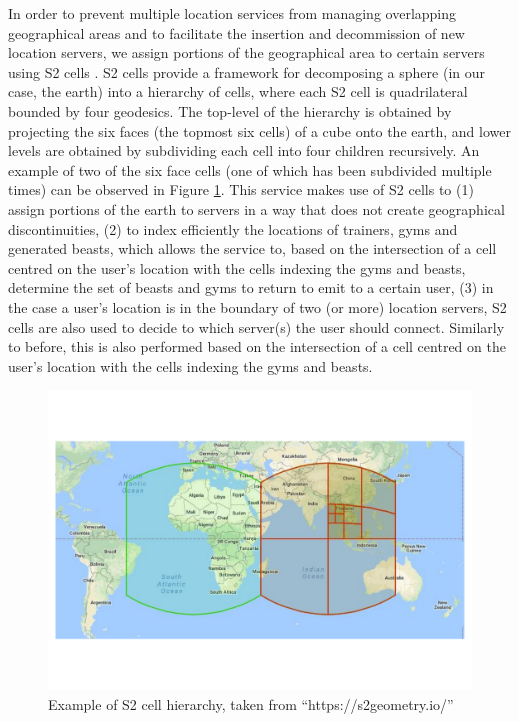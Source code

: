 In order to prevent multiple location services from managing overlapping geographical areas and to facilitate the insertion and decommission of new location servers, we assign portions of the geographical area to certain servers using S2 cells \cite{s2geometry}. S2 cells provide a framework for decomposing a sphere (in our case, the earth) into a hierarchy of cells, where each S2 cell is quadrilateral bounded by four geodesics. The top-level of the hierarchy is obtained by projecting the six faces (the topmost six cells) of a cube onto the earth, and lower levels are obtained by subdividing each cell into four children recursively. An example of two of the six face cells (one of which has been subdivided multiple times) can be observed in Figure \ref{fig:pouchbeasts-s2cells}. This service makes use of S2 cells to (1) assign portions of the earth to servers in a way that does not create geographical discontinuities, (2) to index efficiently the locations of trainers, gyms and generated beasts, which allows the service to, based on the intersection of a cell centred on the user's location with the cells indexing the gyms and beasts, determine the set of beasts and gyms to return to emit to a certain user, (3) in the case a user's location is in the boundary of two (or more) location servers, S2 cells are also used to decide to which server(s) the user should connect. Similarly to before, this is also performed based on the intersection of a cell centred on the user's location with the cells indexing the gyms and beasts.

\begin{figure}[htbp]
    \centering
    \includegraphics[width=\textwidth]{Chapters/benchmark/figures/s2_cells.pdf}
    \caption{Example of S2 cell hierarchy, taken from ``https://s2geometry.io/''}
    \label{fig:pouchbeasts-s2cells}
\end{figure}

